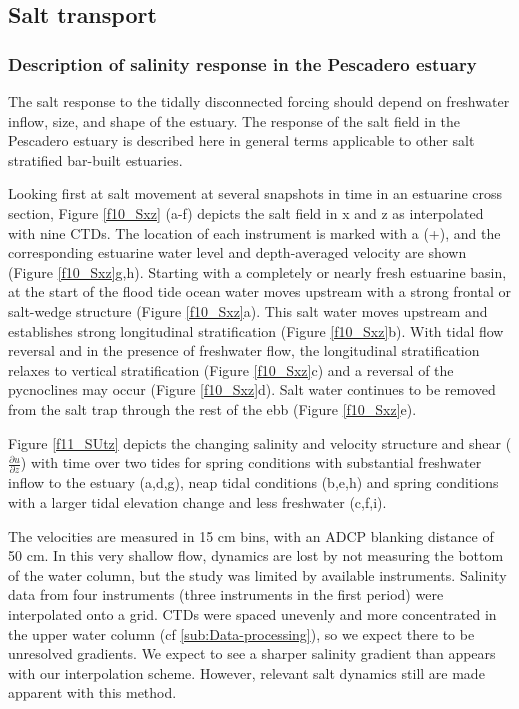 \subsection{Salt transport}


\subsubsection{Description of salinity response in the Pescadero estuary}

The salt response to the tidally disconnected forcing should depend
on freshwater inflow, size, and shape of the estuary. The response
of the salt field in the Pescadero estuary is described here in general
terms applicable to other salt stratified bar-built estuaries.

Looking first at salt movement at several snapshots in time in an
estuarine cross section, Figure \ref{f10_Sxz} (a-f) depicts the salt
field in x and z as interpolated with nine CTDs. The location of each
instrument is marked with a (+), and the corresponding estuarine water
level and depth-averaged velocity are shown (Figure \ref{f10_Sxz}g,h).
Starting with a completely or nearly fresh estuarine basin, at the
start of the flood tide ocean water moves upstream with a strong frontal
or salt-wedge structure (Figure \ref{f10_Sxz}a). This salt water
moves upstream and establishes strong longitudinal stratification
(Figure \ref{f10_Sxz}b). With tidal flow reversal and in the presence
of freshwater flow, the longitudinal stratification relaxes to vertical
stratification (Figure \ref{f10_Sxz}c) and a reversal of the pycnoclines
may occur (Figure \ref{f10_Sxz}d). Salt water continues to be removed
from the salt trap through the rest of the ebb (Figure \ref{f10_Sxz}e).

Figure \ref{f11_SUtz} depicts the changing salinity and velocity
structure and shear ($\frac{\partial u}{\partial z}$) with time over
two tides for spring conditions with substantial freshwater inflow
to the estuary (a,d,g), neap tidal conditions (b,e,h) and spring conditions
with a larger tidal elevation change and less freshwater (c,f,i). 

The velocities are measured in 15 cm bins, with an ADCP blanking distance
of 50 cm. In this very shallow flow, dynamics are lost by not measuring
the bottom of the water column, but the study was limited by available
instruments. Salinity data from four instruments (three instruments
in the first period) were interpolated onto a grid. CTDs were spaced
unevenly and more concentrated in the upper water column (cf \ref{sub:Data-processing}),
so we expect there to be unresolved gradients. We expect to see a
sharper salinity gradient than appears with our interpolation scheme.
However, relevant salt dynamics still are made apparent with this
method. 

